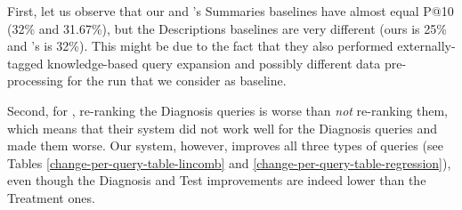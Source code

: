 \begin{table}[h!]
\centering
\caption{Comparison with previous research --- absolute P@10 percent improvements for Summaries 2014 and Descriptions 2014.}
\label{choi-comp}
\end{table}

First, let us observe that our and \cite{choi}'s Summaries baselines have almost equal P@10 (32\% and 31.67\%),
but the Descriptions baselines are very different (ours is 25\% and \cite{choi}'s is 32\%).
This might be due to the fact that they also performed externally-tagged knowledge-based query expansion
and possibly different data pre-processing for the
run that we consider as baseline.

Second, for \cite{choi}, re-ranking the Diagnosis queries is worse than \emph{not} re-ranking them, which means that
their system did not work well for the Diagnosis queries and made them worse.
Our system, however, improves all three types of queries
(see Tables \ref{change-per-query-table-lincomb} and \ref{change-per-query-table-regression}),
even though the Diagnosis and Test improvements are indeed lower than the Treatment ones.

